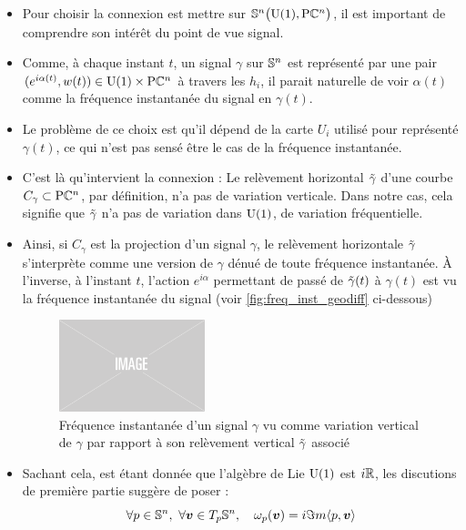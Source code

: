 \begin{itemize}
	
	\item Pour choisir la connexion est mettre sur $\VFP$, il est important de comprendre son intérêt du point de vue signal.
	
	\item Comme, à chaque instant $t$, un signal $\gamma$ sur $\S{n}$ est représenté par une pair $(e^{i\alpha(t)}, w(t))\in\U{1}\times\PC{n}$ à travers les $h_i$, il parait naturelle de voir $\alpha(t)$ comme la fréquence instantanée du signal en $\gamma(t)$.
	
	\item Le problème de ce choix est qu'il dépend de la carte $U_i$ utilisé pour représenté $\gamma(t)$, ce qui n'est pas sensé être le cas de la fréquence instantanée.
	
	\item C'est là qu'intervient la connexion : Le relèvement horizontal $\Tilde{\gamma}$ d'une courbe $C_\gamma\subset\PC{n}$, par définition, n'a pas de variation verticale. Dans notre cas, cela signifie que $\Tilde{\gamma}$ n'a pas de variation dans $\U{1}$, de variation fréquentielle.
	
	\item Ainsi, si $C_\gamma$ est la projection d'un signal $\gamma$, le relèvement horizontale $\Tilde{\gamma}$ s'interprète comme une version de $\gamma$ dénué de toute fréquence instantanée.
	À l'inverse, à l'instant $t$, l'action $e^{i\alpha}$ permettant de passé de $\Tilde{\gamma}(t)$ à $\gamma(t)$ est vu la fréquence instantanée du signal (voir \cref{fig:freq_inst_geodiff} ci-dessous)
	
	\begin{figure}[h]
		\includegraphics[width=0.4\textwidth]{fig/placeholder}
		\caption[Interprétation géométrique de la fréquence instantanée]{Fréquence instantanée d'un signal $\gamma$ vu comme variation vertical de $\gamma$ par rapport à son relèvement vertical $\Tilde{\gamma}$ associé}
		\label{fig:phases_p-cycl}
	\end{figure}	
	
	\item Sachant cela, est étant donnée que l'algèbre de Lie $\U{1}$ est $i\R$,  les discutions de première partie suggère de poser :
	\[\forall p\in\S{n},\ \forall \bf{v}\in\tg[p]{\S{n}},\quad \conn_p(\bf{v}) = i\Im m \langle p, \bf{v}\rangle\]
	

\end{itemize}
